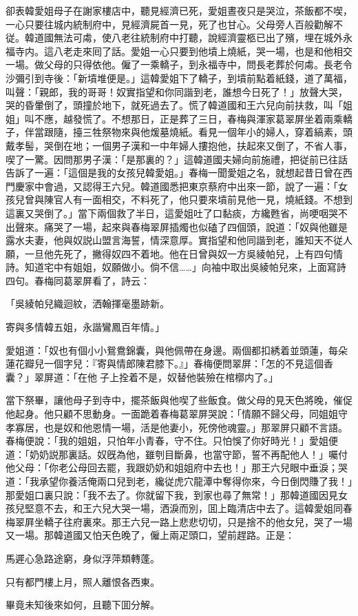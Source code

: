 卻表韓愛姐母子在謝家樓店中，聽見經濟已死，愛姐晝夜只是哭泣，茶飯都不喫，一心只要往城内統制府中，見經濟屍首一見，死了也甘心。父母旁人百般勸解不従。韓道國無法可䖏，使八老往統制府中打聽，說經濟靈柩已出了殯，埋在城外永福寺内。這八老走來囘了話。愛姐一心只要到他墳上燒紙，哭一場，也是和他相交一場。做父母的只得依他。僱了一乘轎子，到永福寺中，問長老葬於何䖏。長老令沙彌引到寺後：「新墳堆便是。」這韓愛姐下了轎子，到墳前點着紙錢，道了萬福，叫聲：「親郎，我的哥哥！奴實指望和你同諧到老，誰想今日死了！」放聲大哭，哭的昏暈倒了，頭撞於地下，就死過去了。慌了韓道國和王六兒向前扶救，叫「姐姐」叫不應，越發慌了。不想那日，正是葬了三日，春梅與渾家葛翠屏坐着兩乘轎子，伴當跟隨，擡三牲祭物來與他煖墓燒紙。看見一個年小的婦人，穿着縞素，頭戴孝髻，哭倒在地；一個男子漢和一中年婦人摟抱他，扶起來又倒了，不省人事，喫了一驚。因問那男子漢：「是那裏的？」這韓道國夫婦向前施禮，把従前已往話告訴了一遍：「這個是我的女孩兒韓愛姐。」春梅一聞愛姐之名，就想起昔日曾在西門慶家中會過，又認得王六兒。韓道國悉把東京蔡府中出來一節，說了一遍：「女孩兒曾與陳官人有一面相交，不料死了，他只要來墳前見他一見，燒紙錢。不想到這裏又哭倒了。」當下兩個救了半日，這愛姐吐了口黏痰，方纔甦省，尚哽咽哭不出聲來。痛哭了一場，起來與春梅翠屏插燭也似磕了四個頭，說道：「奴與他雖是露水夫妻，他與奴説山盟言海誓，情深意厚。實指望和他同諧到老，誰知天不従人願，一旦他先死了，撇得奴四不着地。他在日曾與奴一方吳綾帕兒，上有四句情詩。知道宅中有姐姐，奴願做小。倘不信……」向袖中取出吳綾帕兒來，上面寫詩四句。春梅同葛翠屏看了，詩云：

\begin{myquote}
「吳綾帕兒織迴紋，洒翰揮毫墨跡新。

寄與多情韓五姐，永諧鸞鳳百年情。」
\end{myquote}

愛姐道：「奴也有個小小鴛鴦錦囊，與他佩帶在身邊。兩個都扣綉着並頭蓮，每朵蓮花瓣兒一個字兒：『寄與情郎陳君膝下。』」春梅便問翠屏：「怎的不見這個香囊？」翠屏道：「在他𧜽子上拴着不是，奴替他裝殮在棺槨内了。」

當下祭畢，讓他母子到寺中，擺茶飯與他喫了些飯食。做父母的見天色將晚，催促他起身。他只顧不思動身。一面跪着春梅葛翠屏哭說：「情願不歸父母，同姐姐守孝寡居，也是奴和他恩情一場，活是他妻小，死傍他魂靈。」那翠屏只顧不言語。春梅便說：「我的姐姐，只怕年小青春，守不住。只怕悞了你好時光！」愛姐便道：「奶奶説那裏話。奴旣為他，雖刳目斷鼻，也當守節，誓不再配他人！」囑付他父母：「你老公母回去罷，我跟奶奶和姐姐府中去也！」那王六兒眼中垂淚；哭道：「我承望你養活俺兩口兒到老，纔従虎穴龍潭中奪得你來，今日倒閃賺了我！」那愛姐口裏只說：「我不去了。你就留下我，到家也尋了無常！」那韓道國因見女孩兒堅意不去，和王六兒大哭一場，洒淚而別，囬上臨清店中去了。這韓愛姐同春梅翠屛坐轎子往府裏來。那王六兒一路上悲悲切切，只是捨不的他女兒，哭了一場又一場。那韓道國又怕天色晚了，僱上兩疋頭口，望前趕路。正是：

\begin{myquote}
馬遲心急路途窮，身似浮萍類轉蓬。

只有都門樓上月，照人離恨各西東。
\end{myquote}

畢竟未知後來如何，且聽下囬分解。

